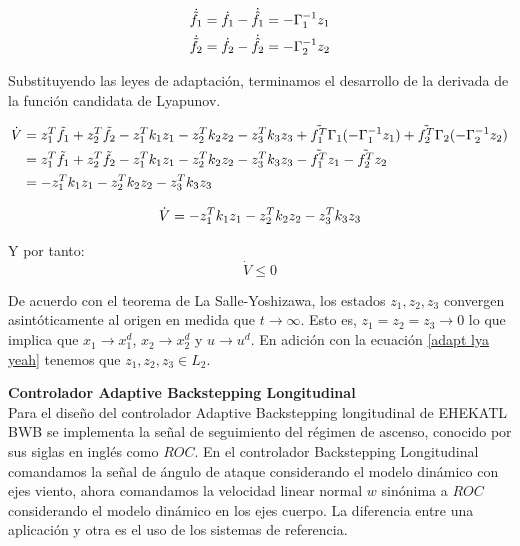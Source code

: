 \begin{gather}
    \dot{\Tilde{f_1}} = \dot f_1 - \dot{\hat{f_1}} = - \Gamma_{1}^{-1} z_1 \\ \nonumber
    \dot{\Tilde{f_2}} = \dot f_2 - \dot{\hat{f_2}} = - \Gamma_{2}^{-1} z_2 \nonumber
\end{gather}

Substituyendo las leyes de adaptación, terminamos el desarrollo de la derivada de la función candidata de Lyapunov.  

\begin{align}
      \dot V &= z^T_1 \Tilde{f_1} + z^T_2 \Tilde{f_2} - z^T_1 k_1 z_1 - z^T_2 k_2 z_2 -  z^T_3  k_3 z_3  + \Tilde{f_1^T}  \Gamma_1 (- \Gamma_{1}^{-1} z_1) + \Tilde{f_2^T} \Gamma_2 (- \Gamma_{2}^{-1} z_2) \nonumber \\ 
      &= z^T_1 \Tilde{f_1} + z^T_2 \Tilde{f_2} - z^T_1 k_1 z_1 - z^T_2 k_2 z_2 -  z^T_3  k_3 z_3  - \Tilde{f_1^T} z_1 - \Tilde{f_2^T} z_2 \nonumber \\
      &= - z^T_1 k_1 z_1 - z^T_2 k_2 z_2 -  z^T_3  k_3 z_3
\end{align}

\begin{equation}
\label{adapt lya yeah}
    \dot V = - z^T_1 k_1 z_1 - z^T_2 k_2 z_2 -  z^T_3  k_3 z_3 \\
\end{equation}

Y por tanto:
\begin{equation}
    \dot V \leqslant 0
\end{equation}

De acuerdo con el teorema de La Salle-Yoshizawa, los estados $z_1,z_2,z_3$ convergen asintóticamente al origen en medida que  $t\to\infty$. 
Esto es, $z_1=z_2 = z_3 \to 0$ lo que implica que $x_1\to x_1^d$, $x_2\to x_2^d$ y $u\to u^d$. En adición con la ecuación \ref{adapt lya yeah} tenemos que $z_1, z_2, z_3 \in L_2$. 

\medskip

\textbf{Controlador Adaptive Backstepping Longitudinal}\\
Para el diseño del controlador Adaptive Backstepping longitudinal de EHEKATL BWB se implementa la señal de seguimiento del régimen de ascenso, conocido por sus siglas en inglés como $ROC$.
En el controlador Backstepping Longitudinal comandamos la señal de ángulo de ataque considerando el modelo dinámico con ejes viento, ahora comandamos la velocidad linear normal $w$ sinónima a $ROC$ considerando el modelo dinámico en los ejes cuerpo. 
La diferencia entre una aplicación y otra es el uso de los sistemas de referencia.

